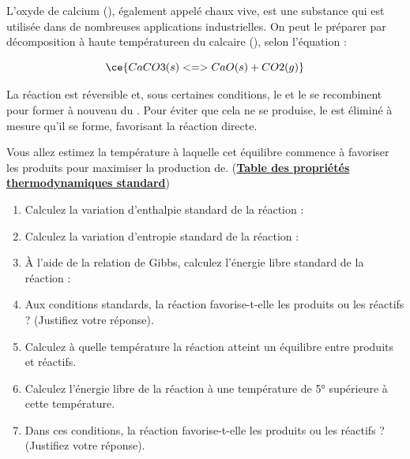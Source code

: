 \documentclass[
  11pt,
  french,
  a4paper,
  openany]{book}
\providecommand{\tightlist}{%
  \setlength{\itemsep}{0pt}\setlength{\parskip}{0pt}}
\begin{document}
\begin{Exercise}

L'oxyde de calcium (), également appelé chaux vive, est une substance qui est utilisée dans de nombreuses applications industrielles. On peut le préparer par décomposition à haute températureen du calcaire (), selon l'équation :

\[ \ce{CaCO3(s) <=> CaO(s) + CO2(g)} \]

La réaction est réversible et, sous certaines conditions, le  et le  se recombinent pour former à nouveau du . Pour éviter que cela ne se produise, le  est éliminé à mesure qu'il se forme, favorisant la réaction directe.

Vous allez estimez la température à laquelle cet équilibre commence à favoriser les produits pour maximiser la production de. (\href{https://bit.ly/GNLC-TPTS}{\textbf{Table des propriétés thermodynamiques standard}})

\begin{enumerate}
\def\labelenumi{\arabic{enumi}.}
\tightlist
\item
  Calculez la variation d'enthalpie standard de la réaction : 
\item
  Calculez la variation d'entropie standard de la réaction : 
\item
  À l'aide de la relation de Gibbs, calculez l'énergie libre standard de la réaction : 
\item
  Aux conditions standards, la réaction favorise-t-elle les produits ou les réactifs ? (Justifiez votre réponse). 
\item
  Calculez à quelle température la réaction atteint un équilibre entre produits et réactifs. 
\item
  Calculez l'énergie libre de la réaction à une température de 5° supérieure à cette température. 
\item
  Dans ces conditions, la réaction favorise-t-elle les produits ou les réactifs ? (Justifiez votre réponse). 
\end{enumerate}


\end{Exercise}
\end{document}
